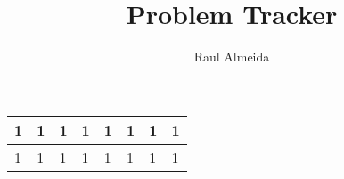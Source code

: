 \documentclass[12pt, a4paper, twoside]{article}
\title{Problem Tracker}
\author{Raul Almeida}
\begin{document}
\date{}
\thispagestyle{empty}

\begin{center}
  \begin{tabular}{ | m{} | m{} | m{} | m{} | m{} | m{} | m{} | m{} | }
  \hline
    1 & 1 & 1 & 1 & 1 & 1 & 1 & 1 \\ \hline
    1 & 1 & 1 & 1 & 1 & 1 & 1 & 1 \\ \hline
\end{tabular}
\end{center}
\end{document}
